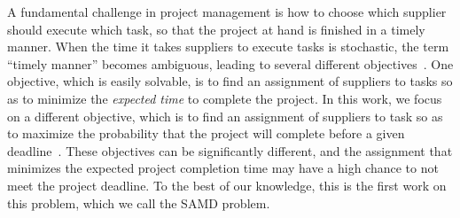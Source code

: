 \documentclass[letterpaper]{article} %
\newcommand{\samd}{\ac{SAMD}\xspace}
\newcommand\Tal[1]{\nb{\textbf{Tal:}}{green}{#1}}
\newcommand\Roni[1]{\nb{\textbf{Roni:}}{blue}{#1}}
\begin{document}

A fundamental challenge in project management is how to choose which supplier should execute which task, so that the project at hand is finished in a timely manner. 
When the time it takes suppliers to execute tasks is stochastic, the term ``timely manner'' becomes ambiguous, leading to several different objectives~\cite{loui1983optimal}. 
One objective, which is easily solvable, is to find an assignment of suppliers to tasks so as to minimize the \emph{expected time} to complete the project. %
In this work, we focus on a different objective, which is to find an assignment of suppliers to task so as to maximize the probability that the project will complete before a given deadline~\cite{harary1969shortest}. 
These objectives can be significantly different, and the assignment that minimizes the expected project completion time may have a high chance to not meet the project deadline. 
To the best of our knowledge, this is the first work on this problem, which we call the \samd problem. 
\end{document}
